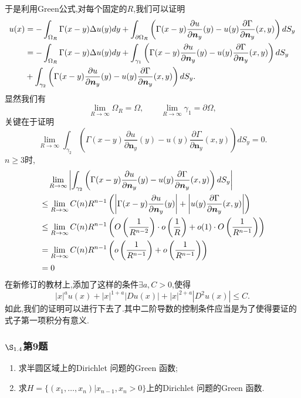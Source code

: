 \documentclass[12pt, a4paper]{ctexart}
\begin{document}
	于是利用Green公式,对每个固定的$R$,我们可以证明
	\begin{align}
		u(x)&= -\int_{\Omega_R} \Gamma(x-y) \Delta u(y) dy + \int_{\partial \Omega_R} \left(\Gamma(x-y) \frac{\partial u}{\partial \bm{n}_y}(y) -u(y)\frac{\partial \Gamma}{\partial \bm{n}_y}(x,y)   \right) dS_y \notag \\
		&=-\int_{\Omega_R} \Gamma(x-y) \Delta u(y) dy + \int_{\gamma_1} \left(\Gamma(x-y) \frac{\partial u}{\partial \bm{n}_y}(y) -u(y)\frac{\partial \Gamma}{\partial \bm{n}_y}(x,y)   \right) dS_y \notag \\
		&+\int_{\gamma_2} \left(\Gamma(x-y) \frac{\partial u}{\partial \bm{n}_y}(y) -u(y)\frac{\partial \Gamma}{\partial \bm{n}_y}(x,y)   \right) dS_y. \notag
	\end{align}
	显然我们有$$
	\lim_{R \to \infty}	\Omega_R = \Omega ,\qquad \lim_{R \to \infty} \gamma_1 = \partial \Omega, $$
	关键在于证明$$
	\lim_{R \to \infty}\int_{\gamma_2} \left(\Gamma(x-y) \frac{\partial u}{\partial \bm{n}_y}(y) -u(y)\frac{\partial \Gamma}{\partial \bm{n}_y}(x,y)   \right) dS_y =0.	$$
	$n \ge 3$时,
	\begin{align}
		&\quad \lim_{R \to \infty} \left|\int_{\gamma_2} \left(\Gamma(x-y) \frac{\partial u}{\partial \bm{n}_y}(y) -u(y)\frac{\partial \Gamma}{\partial \bm{n}_y}(x,y)   \right) dS_y \right| \notag \\
		&\le \lim_{R \to \infty} C(n) R^{n-1} \left( \left| \Gamma(x-y) \frac{\partial u}{\partial \bm{n}_y}(y) \right|+\left|u(y)\frac{\partial \Gamma}{\partial \bm{n}_y}(x,y)   \right| \right) \notag \\
		&\le \lim_{R \to \infty} C(n) R^{n-1} \left( O\left(\frac{1}{R^{n-2}}\right) \cdot o\left(\frac{1}{R}\right) +o(1) \cdot O\left(\frac{1}{R^{n-1}}\right)   \right) \notag \\
		&= \lim_{R \to \infty} C(n) R^{n-1} \left(  o\left(\frac{1}{R^{n-1}}\right) + o\left(\frac{1}{R^{n-1}}\right) \right) \notag \\
		&= 0 \notag
	\end{align}
	{}
	在新修订的教材上,添加了这样的条件$\exists a,C >0$,使得$$
	|x|^a u(x)+|x|^{1+a} |Du(x)| + |x|^{2+a} |D^2 u(x)| \le C.	$$
	如此,我们的证明可以进行下去了.其中二阶导数的控制条件应当是为了使得要证的式子第一项积分有意义.

	\subsubsection{$\S_{1.4}$第9题}
	\kaishu{}
	\begin{enumerate}
		\item 求半圆区域上的Dirichlet 问题的Green 函数;
		\item 求$H = \{(x_1, \dots , x_n)|x_{n−1}, x_n > 0\} $上的Dirichlet 问题的Green 函数.
	\end{enumerate}
\end{document}
